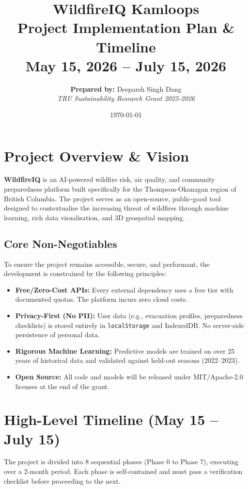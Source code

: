 \documentclass[12pt,letterpaper]{article}
\title{
    \vspace*{2cm}
    \Huge \textbf{WildfireIQ Kamloops}\\
    \vspace{0.5cm}
    \Large Project Implementation Plan \& Timeline\\
    \vspace{0.5cm}
    \large May 15, 2026 -- July 15, 2026
    \vspace{2cm}
}
\author{
    \textbf{Prepared by:} Deeparsh Singh Dang \\
    \textit{TRU Sustainability Research Grant 2025-2026}
}
\date{\vspace{1cm}\today}
\begin{document}
\maketitle
\thispagestyle{empty}
\newpage

\tableofcontents
\newpage

\section{Project Overview \& Vision}
\textbf{WildfireIQ} is an AI-powered wildfire risk, air quality, and community preparedness platform built specifically for the Thompson-Okanagan region of British Columbia. The project serves as an open-source, public-good tool designed to contextualise the increasing threat of wildfires through machine learning, rich data visualisation, and 3D geospatial mapping.

\subsection*{Core Non-Negotiables}
To ensure the project remains accessible, secure, and performant, the development is constrained by the following principles:
\begin{itemize}
    \item \textbf{Free/Zero-Cost APIs:} Every external dependency uses a free tier with documented quotas. The platform incurs zero cloud costs.
    \item \textbf{Privacy-First (No PII):} User data (e.g., evacuation profiles, preparedness checklists) is stored entirely in \texttt{localStorage} and IndexedDB. No server-side persistence of personal data.
    \item \textbf{Rigorous Machine Learning:} Predictive models are trained on over 25 years of historical data and validated against held-out seasons (2022--2023). 
    \item \textbf{Open Source:} All code and models will be released under MIT/Apache-2.0 licenses at the end of the grant.
\end{itemize}

\section{High-Level Timeline (May 15 -- July 15)}
The project is divided into 8 sequential phases (Phase 0 to Phase 7), executing over a 2-month period. Each phase is self-contained and must pass a verification checklist before proceeding to the next.
\end{document}
